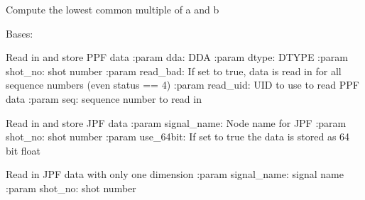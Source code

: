 \documentclass[letterpaper,10pt,english]{sphinxmanual}
\begin{document}

\begin{fulllineitems}
\label{signal_base:signal_base.lcm}
Compute the lowest common multiple of a and b

\end{fulllineitems}


\begin{fulllineitems}
\label{signal_base:signal_base.SignalBase}
Bases: 

\begin{fulllineitems}
\label{signal_base:signal_base.SignalBase.read_data_ppf}
Read in and store PPF data
:param dda: DDA
:param dtype: DTYPE
:param shot\_no: shot number
:param read\_bad: If set to true, data is read in for all sequence numbers (even status == 4)
:param read\_uid: UID to use to read PPF data
:param seq: sequence number to read in

\end{fulllineitems}


\begin{fulllineitems}
\label{signal_base:signal_base.SignalBase.read_data_jpf}
Read in and store JPF data
:param signal\_name: Node name for JPF
:param shot\_no: shot number
:param use\_64bit: If set to true the data is stored as 64 bit float

\end{fulllineitems}


\begin{fulllineitems}
\label{signal_base:signal_base.SignalBase.read_data_jpf_1D}
Read in JPF data with only one dimension
:param signal\_name: signal name
:param shot\_no: shot number


\end{fulllineitems}
\end{fulllineitems}
\end{document}
